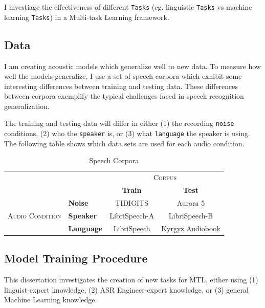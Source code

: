 \documentclass[10pt,a4paper]{article}
\begin{document}
I investiage the effectiveness of different \texttt{Tasks} (eg. linguistic \texttt{Tasks} vs machine learning \texttt{Tasks}) in a Multi-task Learning framework.


\subsection{Data}

I am creating acoustic models which generalize well to new data. To measure how well the models generalize, I use a set of speech corpora which exhibit some interesting differences between training and testing data. These differences between corpora exemplify the typical challenges faced in speech recognition generalization.

The training and testing data will differ in either (1) the recording \texttt{noise} conditions, (2) who the \texttt{speaker} is, or (3) what \texttt{language} the speaker is using. The following table shows which data sets are used for each audio condition.


\begin{table}[htbp]
  \centering
  \begin{adjustbox}{width=.75\textwidth}
    \begin{tabular}{clcc}
      \toprule
      && \multicolumn{2}{c}{\textsc{Corpus}}\\
      && \textbf{Train} & \textbf{Test}\\
      \midrule
      \multirow{3}{*}{\textsc{Audio Condition}} &\textbf{Noise} & TIDIGITS & Aurora 5 \\
      &\textbf{Speaker} & LibriSpeech-A & LibriSpeech-B \\
      &\textbf{Language} & LibriSpeech & Kyrgyz Audiobook \\
      \bottomrule
    \end{tabular}
    \label{table:data}
  \end{adjustbox}
  
  \caption{Speech Corpora}
  
\end{table}


\subsection{Model Training Procedure}

This dissertation investigates the creation of new tasks for MTL, either using (1) linguist-expert knowledge, (2) ASR Engineer-expert knowledge, or (3) general Machine Learning knowledge.
\end{document}
